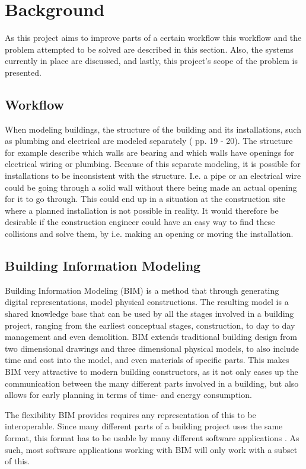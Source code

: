 \section{Background}
As this project aims to improve parts of a certain workflow this workflow and the problem attempted to be solved are described in this section. Also, the systems currently in place are discussed, and lastly, this project's scope of the problem is presented.
\subsection{Workflow}
\label{sec:workflow}
When modeling buildings, the structure of the building and its installations, such as plumbing and electrical are modeled separately (\cite{jorgensen10} pp. 19 - 20). The structure for example describe which walls are bearing and which walls have openings for electrical wiring or plumbing.  Because of this separate modeling, it is possible for installations to be inconsistent with the structure. I.e. a pipe or an electrical wire could be going through a solid wall without there being made an actual opening for it to go through. This could end up in a situation at the construction site where a planned installation is not possible in reality. It would therefore be desirable if the construction engineer could have an easy way to find these collisions and solve them, by i.e. making an opening or moving the installation\cite{jorgensen12}.
\subsection{Building Information Modeling}
\label{sec:building_information_modeling}
Building Information Modeling (BIM) is a method that through generating digital representations, model physical constructions. The resulting model is a shared knowledge base that can be used by all the stages involved in a building project, ranging from the earliest conceptual stages, construction, to day to day management and even demolition. BIM extends traditional building design from two dimensional drawings and three dimensional physical models, to also include time and cost into the model, and even materials of specific parts. This makes BIM very attractive to modern building constructors, as it not only eases up the communication between the many different parts involved in a building, but also allows for early planning in terms of time- and energy consumption.

The flexibility BIM provides requires any representation of this to be interoperable. Since many different parts of a building project uses the same format, this format has to be usable by many different software applications \cite{quteprints37725}. As such, most software applications working with BIM will only work with a subset of this.
